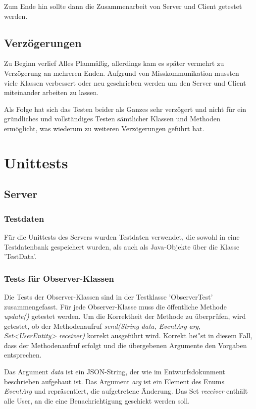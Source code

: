 \documentclass[11pt,a4paper]{scrartcl}
\begin{document}
Zum Ende hin sollte dann die Zusammenarbeit von Server und Client getestet werden.

\subsection{Verzögerungen}
Zu Beginn verlief Alles Planmäßig, allerdings kam es später vermehrt zu Verzögerung an mehreren Enden.
Aufgrund von Misskommunikation mussten viele Klassen verbessert oder neu geschrieben werden um den Server und Client miteinander arbeiten zu lassen.
 
Als Folge hat sich das Testen beider als Ganzes sehr verzögert und nicht für ein gründliches und vollständiges Testen sämtlicher Klassen und Methoden ermöglicht, was wiederum zu weiteren Verzögerungen geführt hat.

\newpage

\section{Unittests}

\subsection{Server}

\subsubsection{Testdaten}\label{Testdaten}
Für die Unittests des Servers wurden Testdaten verwendet, die sowohl in eine Testdatenbank gespeichert wurden, als auch als Java-Objekte über die Klasse 'TestData'.

\subsubsection{Tests für Observer-Klassen}
Die Tests der Observer-Klassen sind in der Testklasse 'ObserverTest' zusammengefasst. Für jede Observer-Klasse muss die öffentliche Methode \textit{update()} getestet werden.
Um die Korrektheit der Methode zu überprüfen, wird getestet, ob der Methodenaufruf \textit{send(String data, EventArg arg, Set<UserEntity> receiver)} korrekt ausgeführt wird. Korrekt hei"st in diesem Fall, dass der Methodenaufruf erfolgt und die übergebenen Argumente den Vorgaben entsprechen.

Das Argument \textit{data} ist ein JSON-String, der wie im Entwurfsdokunment beschrieben aufgebaut ist. Das Argument \textit{arg} ist ein Element des Enums \textit{EventArg} und repräsentiert, die aufgetretene Änderung. Das Set \textit{receiver} enthält alle User, an die eine Benachrichtigung geschickt werden soll.
\end{document}
